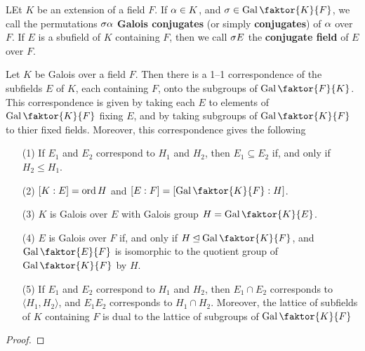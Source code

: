 \begin{definition}
    LEt $K$ be an extension of a field  $F$. If  $\alpha \in K$, and  $\s \in
    \Gal{\faktor{K}{F}}$, we call the permutations $\sigma\alpha$  \textbf{Galois
    conjugates} (or simply \textbf{conjugates}) of $\alpha$ over $F$. If $E$ is a
    sbufield of  $K$ containing  $F$, then we call  $\sigma{E}$ the
    \textbf{conjugate field} of $E$over  $F$.
\end{definition}

\begin{theorem}\label{2.2.4}
    Let $K$ be Galois over a field  $F$. Then there is a 1--1 correspondence of
    the subfields  $E$ of  $K$, each containing $F$, onto the subgroups of
    $\Gal{\faktor{F}{K}}$. This correspondence is given by taking each $E$ to
    elements of $\Gal{\faktor{K}{F}}$ fixing $E$, and by taking subgroups of
    $\Gal{\faktor{K}{F}}$ to thier fixed fields. Moreover, this correspondence
    gives the following
    \begin{enumerate}
        \item[(1)] If $E_1$ and $E_2$ correspond to $H_1$ and $H_2$, then $E_1
            \subseteq E_2$ if, and only if $H_2 \leq H_1$.

        \item[(2)] $[K:E]=\operatorname{ord}{H}$ and $[E:F]=[\Gal{\faktor{K}{F}}:H]$.

        \item[(3)] $K$ is Galois over  $E$ with Galois group $H=\Gal{\faktor{K}{E}}$.

        \item[(4)] $E$ is Galois over  $F$ if, and only if  $H \unlhd
            \Gal{\faktor{K}{F}}$, and $\Gal{\faktor{E}{F}}$ is isomorphic to the
            quotient group of $\Gal{\faktor{K}{F}}$ by $H$.

        \item[(5)] If $E_1$ and $E_2$ correspond to $H_1$ and $H_2$, then $E_1
            \cap E_2$ corresponds to $\langle H_1, H_2 \rangle$, and $E_1E_2$
            corresponds to $H_1 \cap H_2$. Moreover, the lattice of subfields of
            $K$ containing  $F$ is dual to the lattice of subgroups of
            $\Gal{\faktor{K}{F}}$
    \end{enumerate}
\end{theorem}
\begin{proof}
\end{proof}
